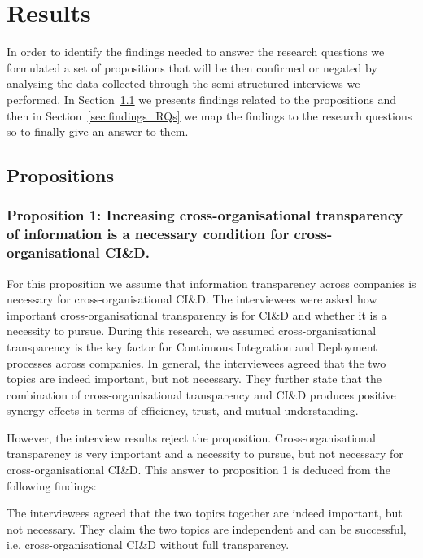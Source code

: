 \section{Results}\label{sec:results}

In order to identify the findings needed to answer the research questions we formulated a set of propositions that will be then confirmed or negated by analysing the data collected through the semi-structured interviews we performed. In Section~\ref{sec:propositions} we presents findings related to the propositions and then in Section~\ref{sec:findings_RQs} we map the findings to the research questions so to finally give an answer to them.

\subsection{Propositions}\label{sec:propositions}

\subsubsection{Proposition 1: Increasing cross-organisational transparency of information is a necessary condition for cross-organisational CI\&D.}


For this proposition we assume that information transparency across companies is necessary for cross-organisational CI\&D. The interviewees were asked how important cross-organisational transparency is for CI\&D and whether it is a necessity to pursue. During this research, we assumed cross-organisational transparency is the key factor for Continuous Integration and Deployment processes across companies. In general, the interviewees agreed that the two topics are indeed important, but not necessary. They further state that the combination of cross-organisational transparency and CI\&D produces positive synergy effects in terms of efficiency, trust, and mutual understanding.

However, the interview results reject the proposition. Cross-organisational transparency is very important and a necessity to pursue, but not necessary for cross-organisational CI\&D. This answer to proposition 1 is deduced from the following findings:

 The interviewees agreed that the two topics together are indeed important, but not necessary. They claim the two topics are independent and can be successful, i.e. cross-organisational CI\&D without full transparency.

